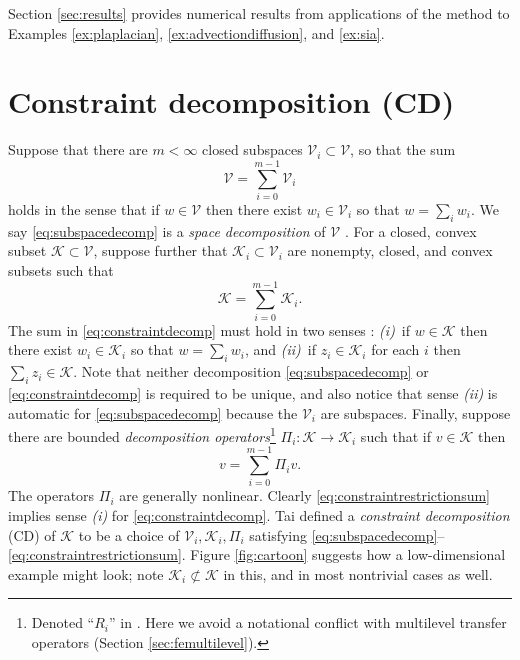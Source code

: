 \documentclass[letterpaper,final,12pt,reqno]{amsart}
\theoremstyle{cstyle}
\theoremstyle{cstyle*}
\theoremstyle{dstyle}
\numberwithin{equation}{section}
\numberwithin{figure}{section}
\numberwithin{table}{section}
\numberwithin{theorem}{section}
\newcommand{\cK}{\mathcal{K}}
\newcommand{\cV}{\mathcal{V}}
\begin{document}
Section \ref{sec:results} provides numerical results from applications of the  method to Examples \ref{ex:plaplacian}, \ref{ex:advectiondiffusion}, and \ref{ex:sia}.


\section{Constraint decomposition (CD)} \label{sec:cd}

Suppose that there are $m<\infty$ closed subspaces $\cV_i \subset \cV$, so that the sum
\begin{equation}
\cV = \sum_{i=0}^{m-1} \cV_i \label{eq:subspacedecomp}
\end{equation}
holds in the sense that if $w \in \cV$ then there exist $w_i \in \cV_i$ so that $w = \sum_i w_i$.  We say \eqref{eq:subspacedecomp} is a \emph{space decomposition} of $\cV$ \cite{Xu1992}.  For a closed, convex subset $\cK \subset \cV$, suppose further that $\cK_i \subset \cV_i$ are nonempty, closed, and convex subsets such that
\begin{equation}
\cK = \sum_{i=0}^{m-1} \cK_i. \label{eq:constraintdecomp}
\end{equation}
The sum in \eqref{eq:constraintdecomp} must hold in two senses \cite{TaiTseng2002}: \emph{(i)}~if $w \in \cK$ then there exist $w_i \in \cK_i$ so that $w = \sum_i w_i$, and \emph{(ii)}~if $z_i \in \cK_i$ for each $i$ then $\sum_i z_i \in \cK$.  Note that neither decomposition \eqref{eq:subspacedecomp} or \eqref{eq:constraintdecomp} is required to be unique, and also notice that sense \emph{(ii)} is automatic for \eqref{eq:subspacedecomp} because the $\cV_i$ are subspaces.  Finally, suppose there are bounded \emph{decomposition operators}\footnote{Denoted ``$R_i$'' in \cite{Tai2003}.  Here we avoid a notational conflict with multilevel transfer operators (Section \ref{sec:femultilevel}).} $\Pi_i : \cK \to \cK_i$ such that if $v \in \cK$ then
\begin{equation}
v = \sum_{i=0}^{m-1} \Pi_i v.  \label{eq:constraintrestrictionsum}
\end{equation}
The operators $\Pi_i$ are generally nonlinear.  Clearly \eqref{eq:constraintrestrictionsum} implies sense \emph{(i)} for \eqref{eq:constraintdecomp}. Tai \cite{Tai2003} defined a \emph{constraint decomposition} (CD) of $\cK$ to be a choice of $\cV_i,\cK_i,\Pi_i$ satisfying \eqref{eq:subspacedecomp}--\eqref{eq:constraintrestrictionsum}.  Figure \ref{fig:cartoon} suggests how a low-dimensional example might look; note $\cK_i \not\subset \cK$ in this, and in most nontrivial cases as well.
\end{document}
